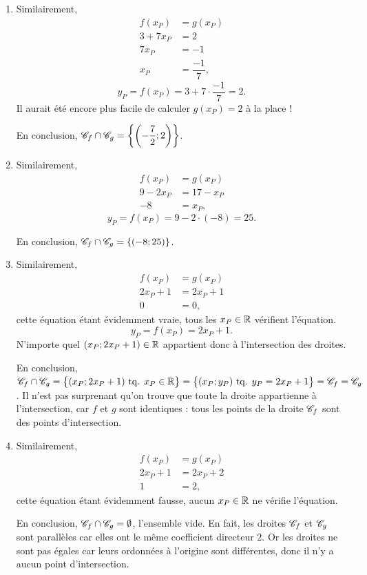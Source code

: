 {\begin{enumerate}
		\item 
			Similairement,
			\begin{align*}
				f(x_P) &= g(x_P) \\
				3 + 7x_P & = 2 \\
				7x_P &= -1 \\
				x_P &= \dfrac{-1}7,
			\end{align*}
			\[
				y_P = f(x_P) = 3+7\cdot \dfrac{-1}7  = 2.
			\]
			Il aurait été encore plus facile de calculer $g(x_P) = 2$ à la place !
			
			En conclusion, $\mathcal{C}_f \cap \mathcal{C}_g = \left\{ \left(-\dfrac72 ; 2\right) \right\}$.
		
		\item
			Similairement,
			\begin{align*}
				f(x_P) &= g(x_P) \\
				9-2x_P & = 17-x_P \\
				-8 &= x_P,
			\end{align*}
			\[
				y_P = f(x_P) = 9-2 \cdot(-8) = 25.
			\]
		
			En conclusion, $\mathcal{C}_f \cap \mathcal{C}_g = \left\{ (-8;25) \right\}$.
		
		\item 			
		Similairement,
			\begin{align*}
				f(x_P) &= g(x_P) \\
				2x_P + 1 & = 2x_P + 1 \\
				0 &= 0,
			\end{align*}
			cette équation étant évidemment vraie, tous les $x_P \in \mathbb{R}$ vérifient l'équation.
			\[
				y_P = f(x_P) = 2x_P + 1.
			\]
			N'importe quel $(x_P ; 2x_P+1) \in \mathbb{R}$ appartient donc à l'intersection des droites.
			
			En conclusion, $\mathcal{C}_f \cap \mathcal{C}_g = \bigl\{  (x_P ; 2x_P+1) \text{ tq. } x_P \in \mathbb{R}  \bigr\} = \bigl\{  (x_P ; y_P) \text{ tq. } y_P = 2x_P + 1  \bigr\} = \mathcal{C}_f = \mathcal{C}_g$.
			Il n'est pas surprenant qu'on trouve que toute la droite appartienne à l'intersection, car $f$ et $g$ sont identiques : tous les points de la droite $\mathcal{C}_f$ sont des points d'intersection.
		
		
		\item 
			Similairement,
			\begin{align*}
				f(x_P) &= g(x_P) \\
				2x_P + 1 & = 2x_P + 2 \\
				1 &= 2,
			\end{align*}
			cette équation étant évidemment fausse, aucun $x_P \in \mathbb{R}$ ne vérifie l'équation.
			
			En conclusion, $\mathcal{C}_f \cap \mathcal{C}_g = \emptyset$, l'ensemble vide.
			En fait, les droites $\mathcal{C}_f$ et $\mathcal{C}_g$ sont parallèles car elles ont le même coefficient directeur $2$.
			Or les droites ne sont pas égales car leurs ordonnées à l'origine sont différentes, donc il n'y a aucun point d'intersection.
	\end{enumerate}

}




